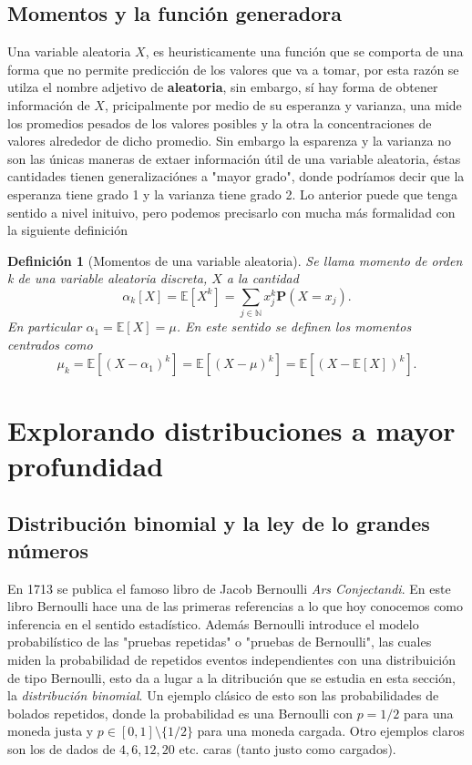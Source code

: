 \documentclass[letterpaper]{book}
\newtheorem{def.}{Definici\'on}[section]
\newcommand{\nat}{\ensuremath{ \mathbb N }}
\newcommand{\prob}{\textbf{P}}
\newcommand{\esp}{\mathbb E}
\begin{document}
\section{Momentos y la función generadora}
\label{sec:orga037945}
\noindent Una variable aleatoria \(X\), es heuristicamente una función que se comporta de una forma que no permite predicción de los valores que va a tomar, por esta razón se utilza el nombre adjetivo de \textbf{aleatoria}, sin embargo, sí hay forma de obtener información de \(X\), pricipalmente por medio de su esperanza y varianza, una mide los promedios pesados de los valores posibles y la otra la concentraciones de valores alrededor de dicho promedio. Sin embargo la esparenza y la varianza no son las únicas maneras de extaer información útil de una variable aleatoria, éstas cantidades tienen generalizaciónes a "mayor grado", donde podríamos decir que la esperanza tiene grado 1 y la varianza tiene grado 2. Lo anterior puede que tenga sentido a nivel inituivo, pero podemos precisarlo con mucha más formalidad con la siguiente definición
\begin{def.}[Momentos de una variable aleatoria]
Se llama \emph{momento de orden k} de una variable aleatoria discreta, \(X\) a la cantidad
\[
\alpha_k[X]=\esp[X^k]=\sum_{j\in\nat}x_j^k\prob(X=x_j).
\]
En particular \(\alpha_1=\esp[X]=\mu\). En este sentido se definen los momentos centrados como
\[
\mu_k=\esp[(X-\alpha_1)^k]=\esp[(X-\mu)^k]=\esp[(X-\esp[X])^k].
\]
\end{def.}

\chapter{Explorando distribuciones a mayor profundidad}
\label{sec:org9ccb623}

\section{Distribución binomial y la ley de lo grandes números}
\label{sec:org412b06d}
\noindent En 1713 se publica el famoso libro de Jacob Bernoulli \emph{Ars Conjectandi}. En este libro Bernoulli hace una de las primeras referencias a lo que hoy conocemos como inferencia en el sentido estadístico. Además Bernoulli introduce el modelo probabilístico de las "pruebas repetidas" o "pruebas de Bernoulli", las cuales miden la probabilidad de repetidos eventos independientes con una distribuición de tipo Bernoulli, esto da a lugar a la ditribución que se estudia en esta sección, la \emph{distribución binomial}.
Un ejemplo clásico de esto son las probabilidades de bolados repetidos, donde la probabilidad es una Bernoulli con \(p=1/2\) para una moneda justa y \(p\in[0,1]\setminus\{1/2\}\) para una moneda cargada. Otro ejemplos claros son los de dados de \(4,6,12,20\) etc. caras (tanto justo como cargados).
\end{document}
